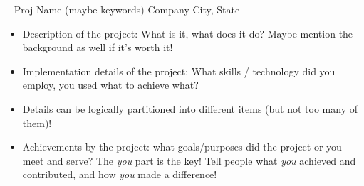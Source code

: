 \cventry
{ -- }
{%
    Proj Name
    (maybe keywords)%
}
{Company}
{City, State}
{}
{%
    \begin{itemize}
        \item
            Description of the project:
            What is it,
            what does it do?
            Maybe mention the background as well if it's worth it!
        \item
            Implementation details of the project:
            What skills / technology did you employ,
            you used what to achieve what?
        \item
            Details can be logically partitioned into different items
            (but not too many of them)!
        \item
            Achievements by the project:
            what goals/purposes did the project or you meet and serve?
            The \emph{you} part is the key!
            Tell people what \emph{you} achieved and contributed,
            and how \emph{you} made a difference!
    \end{itemize}
}

